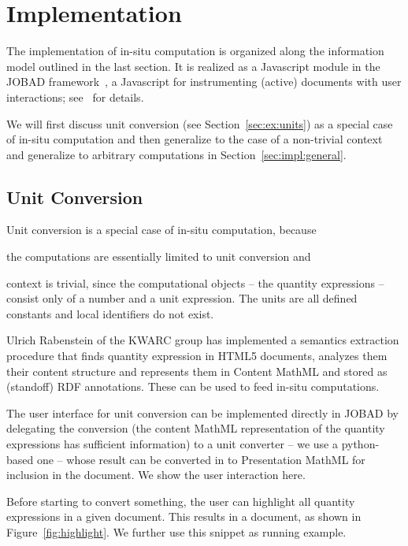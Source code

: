 \section{Implementation}\label{sec:impl}
 The
implementation of in-situ computation is organized along the information model outlined in
the last section. It is realized as a Javascript module in the JOBAD
framework~\cite{JOBAD:on}, a Javascript for instrumenting (active) documents with user
interactions; see~\cite{GLR:WebSvcActMathDoc09} for details.

We will first discuss unit conversion (see Section~\ref{sec:ex:units}) as a special case
of in-situ computation and then generalize to the case of a non-trivial context and
generalize to arbitrary computations in Section~\ref{sec:impl:general}.
  
\subsection{Unit Conversion}
Unit conversion is a special case of in-situ computation, because
\begin{compactitem}
\item the computations are essentially limited to unit conversion and
\item context is trivial, since the computational objects -- the quantity expressions --
  consist only of a number and a unit expression. The units are all defined constants and
  local identifiers do not exist.
\end{compactitem}
Ulrich Rabenstein of the KWARC group has implemented a semantics extraction procedure that
finds quantity expression in HTML5 documents, analyzes them their content structure and
represents them in Content MathML and stored as (standoff) RDF annotations. These can be
used to feed in-situ computations.

The user interface for unit conversion can be implemented directly in JOBAD by delegating
the conversion (the content MathML representation of the quantity expressions has
sufficient information) to a unit converter -- we use a python-based one -- whose result
can be converted in to Presentation MathML for inclusion in the document. We show the user
interaction here.

Before starting to convert something, the user can highlight all quantity
expressions in a given document. This results in a document, as shown in
Figure~\ref{fig:highlight}. We further use this snippet as running example.

